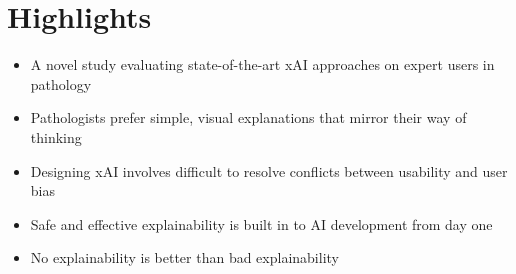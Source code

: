 \section*{\textbf{Highlights}}

\begin{itemize}
    \item A novel study evaluating state-of-the-art xAI approaches on expert users in pathology
    \item Pathologists prefer simple, visual explanations that mirror their way of thinking
    \item Designing xAI involves difficult to resolve conflicts between usability and user bias
    \item Safe and effective explainability is built in to AI development from day one
    \item No explainability is better than bad explainability
\end{itemize}
